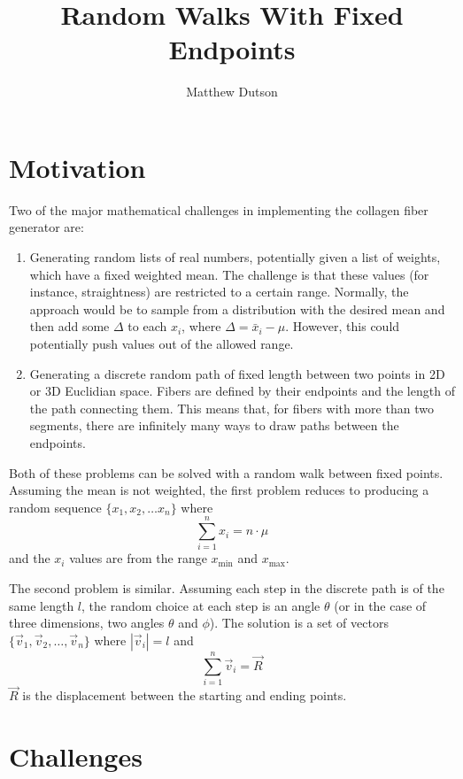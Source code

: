 \documentclass[12pt]{article}
\title{Random Walks With Fixed Endpoints}
\author{Matthew Dutson}
\begin{document}
\maketitle
\thispagestyle{empty}
\pagestyle{empty}


\section*{Motivation}

Two of the major mathematical challenges in implementing the collagen fiber generator are: 
\begin{enumerate}
    \item Generating random lists of real numbers, potentially given a list of weights, which have a fixed weighted mean. The challenge is that these values (for instance, straightness) are restricted to a certain range. Normally, the approach would be to sample from a distribution with the desired mean and then add some $\Delta$ to each $x_i$, where $\Delta = \bar{x}_i - \mu$. However, this could potentially push values out of the allowed range.
    \item Generating a discrete random path of fixed length between two points in 2D or 3D Euclidian space. Fibers are defined by their endpoints and the length of the path connecting them. This means that, for fibers with more than two segments, there are infinitely many ways to draw paths between the endpoints.
\end{enumerate}
Both of these problems can be solved with a random walk between fixed points. Assuming the mean is not weighted, the first problem reduces to producing a random sequence $\{x_1, x_2, \ldots x_n\}$ where
\begin{equation*}
    \sum_{i = 1}^n x_i = n \cdot \mu
\end{equation*}
and the $x_i$ values are from the range $x_\text{min}$ and $x_\text{max}$.

The second problem is similar. Assuming each step in the discrete path is of the same length $l$, the random choice at each step is an angle $\theta$ (or in the case of three dimensions, two angles $\theta$ and $\phi$). The solution is a set of vectors $\{\vec{v}_1, \vec{v}_2, \ldots, \vec{v}_n\}$ where $|\vec{v}_i| = l$ and
\begin{equation*}
    \sum_{i = 1}^n \vec{v}_i = \vec{R}
\end{equation*}
$\vec{R}$ is the displacement between the starting and ending points.


\section*{Challenges}
\end{document}
